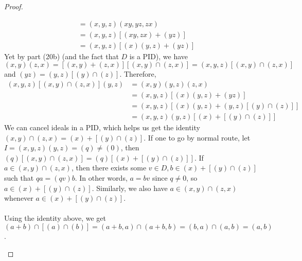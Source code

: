 \documentclass{article}
\theoremstyle{definition}
\begin{document}
\begin{proof}
\begin{enumerate}
\begin{enumerate}
\begin{align*}
		& = (x, y, z) (xy, yz, zx) \\
		& = (x, y, z) [(xy, zx) + (yz)] \\
		& = (x, y, z) [(x)(y, z) + (yz)]
		\end{align*}
		Yet by part (20b) (and the fact that $D$ is a PID), we have $(x, y) (z, x) = [(x, y) + (z, x)] [(x, y) \cap (z, x)] = (x, y, z) [(x, y) \cap (z, x)]$ and $(yz) = (y, z) [(y) \cap (z)]$. Therefore,
		\begin{align*}
		(x, y, z) [(x, y) \cap (z, x)] (y, z) & = (x, y) (y, z) (z, x) \\
		& = (x, y, z) [(x)(y, z) + (yz)] \\
		& = (x, y, z) [(x)(y, z) + (y, z)[(y) \cap (z)]] \\
		& = (x, y, z) (y, z) [(x) + [(y) \cap (z)]]
		\end{align*}
		We can cancel ideals in a PID, which helps us get the identity $(x, y) \cap (z, x) = (x) + [(y) \cap (z)]$. If one to go by normal route, let $I = (x, y, z) (y, z) = (q) \neq (0)$, then $(q) [(x, y) \cap (z, x)] = (q) [(x) + [(y) \cap (z)]]$. If $a \in (x, y) \cap (z, x)$, then there exists some $v \in D, b \in (x) + [(y) \cap (z)]$ such that $qa = (qv) b$. In other words, $a = bv$ since $q \neq 0$, so $a \in (x) + [(y) \cap (z)]$. Similarly, we also have $a \in (x, y) \cap (z, x)$ whenever $a \in (x) + [(y) \cap (z)]$.
		\\
		\\
		Using the identity above, we get $(a + b) \cap [(a) \cap (b)] = (a + b, a) \cap (a + b, b) = (b, a) \cap (a, b) = (a, b)$.
	\end{enumerate}
\end{enumerate}
\end{proof}

\newpage
\end{document}
